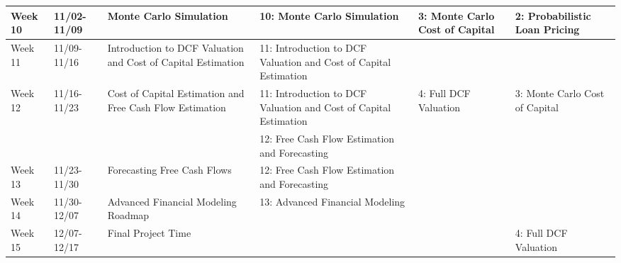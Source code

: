 \documentclass[]{article}
\begin{document}
\begin{landscape}
\begin{tabular}{L{1.3cm}lL{5cm}L{9cm}L{2.5cm}L{2.5cm}}
\hline
Week 10 & 11/02-11/09 & Monte Carlo Simulation & 10: Monte Carlo Simulation & 3: Monte Carlo Cost of Capital & 2: Probabilistic Loan Pricing\\

\hline
Week 11 & 11/09-11/16 & Introduction to DCF Valuation and Cost of Capital Estimation & 11: Introduction to DCF Valuation and Cost of Capital Estimation &  & \\

\hline
Week 12 & 11/16-11/23 & Cost of Capital Estimation and Free Cash Flow Estimation & 11: Introduction to DCF Valuation and Cost of Capital Estimation & 4: Full DCF Valuation & 3: Monte Carlo Cost of Capital\\
 &  &  & 12: Free Cash Flow Estimation and Forecasting &  & \\

\hline
Week 13 & 11/23-11/30 & Forecasting Free Cash Flows & 12: Free Cash Flow Estimation and Forecasting &  & \\

\hline
Week 14 & 11/30-12/07 & Advanced Financial Modeling Roadmap & 13: Advanced Financial Modeling &  & \\

\hline
Week 15 & 12/07-12/17 & Final Project Time &  &  & 4: Full DCF Valuation\\

\bottomrule
\end{tabular}
\end{landscape}
\end{document}
